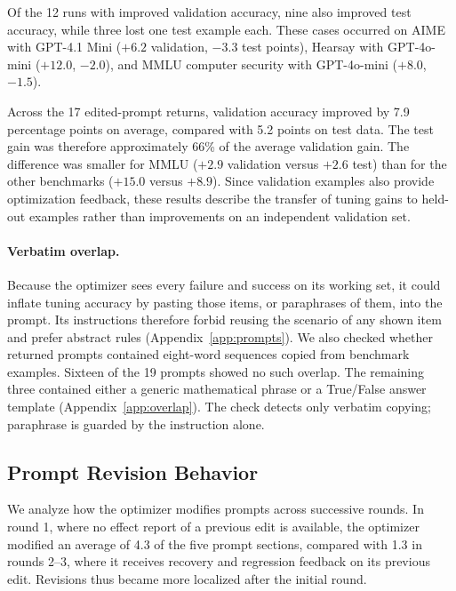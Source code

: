 \documentclass[10pt]{article} %
\begin{document}
Of the 12 runs with improved validation accuracy, nine also improved test accuracy, while three lost one test example each. These cases occurred on AIME with GPT-4.1 Mini ($+6.2$ validation, $-3.3$ test points), Hearsay with GPT-4o-mini ($+12.0$, $-2.0$), and MMLU computer security with GPT-4o-mini ($+8.0$, $-1.5$).

Across the 17 edited-prompt returns, validation accuracy improved by 7.9 percentage points on average, compared with 5.2 points on test data. The test gain was therefore approximately 66\% of the average validation gain. The difference was smaller for MMLU ($+2.9$ validation versus $+2.6$ test) than for the other benchmarks ($+15.0$ versus $+8.9$).
Since validation examples also provide optimization feedback, these results describe the transfer of tuning gains to held-out examples rather than improvements on an independent validation set.

\paragraph{Verbatim overlap.}
Because the optimizer sees every failure and success on its working set, it could inflate tuning accuracy by pasting those items, or paraphrases of them, into the prompt. Its instructions therefore forbid reusing the scenario of any shown item and prefer abstract rules (Appendix~\ref{app:prompts}). We also checked whether returned prompts contained eight-word sequences copied from benchmark examples. Sixteen of the 19 prompts showed no such overlap. The remaining three contained either a generic mathematical phrase or a True/False answer template (Appendix~\ref{app:overlap}). The check detects only verbatim copying; paraphrase is guarded by the instruction alone.

\subsection{Prompt Revision Behavior}
\label{sec:edits}

We analyze how the optimizer modifies prompts across successive rounds. In round 1, where no effect report of a previous edit is available, the optimizer modified an average of 4.3 of the five prompt sections, compared with 1.3 in rounds 2--3, where it receives recovery and regression feedback on its previous edit. Revisions thus became more localized after the initial round.

\end{document}
